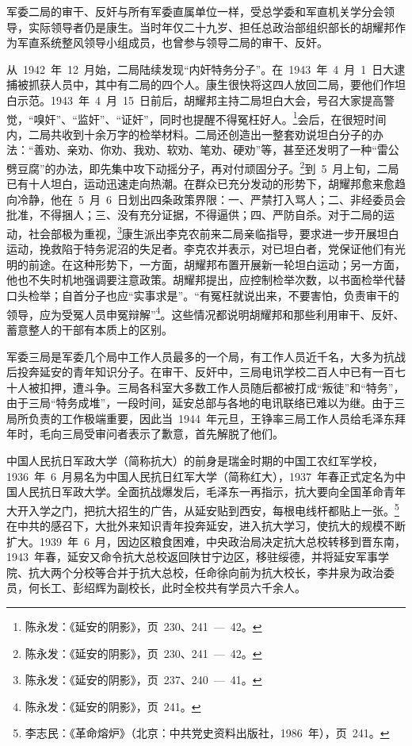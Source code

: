 军委二局的审干、反奸与所有军委直属单位一样，受总学委和军直机关学分会领导，实际领导者仍是康生。当时年仅二十九岁、担任总政治部组织部长的胡耀邦作为军直系统整风领导小组成员，也曾参与领导二局的审干、反奸。

从~1942~年~12~月始，二局陆续发现“内奸特务分子”。在~1943~年~4~月~1~日大逮捕被抓获人员中，其中有二局的四个人。康生很快将这四人放回二局，要他们作坦白示范。1943~年~4~月~15~日前后，胡耀邦主持二局坦白大会，号召大家提高警觉，“嗅奸”、“监奸”、“证奸”，同时也提醒不得冤枉好人。\footnote{陈永发：《延安的阴影》，页~230、241~—~42。}会后，在很短时间内，二局共收到十余万字的检举材料。二局还创造出一整套劝说坦白分子的办法：“善劝、亲劝、你劝、我劝、软劝、笔劝、硬劝”等，甚至还发明了一种“雷公劈豆腐”的办法，即先集中攻下动摇分子，再对付顽固分子。\footnote{陈永发：《延安的阴影》，页~230、241~—~42。}到~5~月上旬，二局已有十人坦白，运动迅速走向热潮。在群众已充分发动的形势下，胡耀邦愈来愈趋向冷静，他在~5~月~6~日划出四条政策界限：一、严禁打入骂人；二、非经委员会批准，不得捆人；三、没有充分证据，不得逼供；四、严防自杀。对于二局的运动，社会部极为重视，\footnote{陈永发：《延安的阴影》，页~237、240~—~41。}康生派出李克农前来二局亲临指导，要求进一步开展坦白运动，挽救陷于特务泥沼的失足者。李克农并表示，对已坦白者，党保证他们有光明的前途。在这种形势下，一方面，胡耀邦布置开展新一轮坦白运动；另一方面，他也不失时机地强调要注意政策。胡耀邦提出，应控制检举次数，以书面检举代替口头检举；自首分子也应“实事求是”。“有冤枉就说出来，不要害怕，负责审干的领导，应为受冤人员申冤辩解”\footnote{陈永发：《延安的阴影》，页~241。}。这些情况都说明胡耀邦和那些利用审干、反奸、蓄意整人的干部有本质上的区别。

军委三局是军委几个局中工作人员最多的一个局，有工作人员近千名，大多为抗战后投奔延安的青年知识分子。在审干、反奸中，三局电讯学校二百人中已有一百七十人被扣押，遭斗争。三局各科室大多数工作人员随后都被打成“叛徒”和“特务”，由于三局“特务成堆”，一段时间，延安总部与各地的电讯联络已难以为继。由于三局所负责的工作极端重要，因此当~1944~年元旦，王铮率三局工作人员给毛泽东拜年时，毛向三局受审问者表示了歉意，首先解脱了他们。

中国人民抗日军政大学（简称抗大）的前身是瑞金时期的中国工农红军学校，1936~年~6~月易名为中国人民抗日红军大学（简称红大），1937~年春正式定名为中国人民抗日军政大学。全面抗战爆发后，毛泽东一再指示，抗大要向全国革命青年大开入学之门，把抗大招生的广告，从延安贴到西安，每根电线杆都贴上一张。\footnote{李志民：《革命熔炉》（北京：中共党史资料出版社，1986~年），页~241。}在中共的感召下，大批外来知识青年投奔延安，进入抗大学习，使抗大的规模不断扩大。1939~年~6~月，因边区粮食困难，中央政治局决定抗大总校转移到晋东南，1943~年春，延安又命令抗大总校返回陕甘宁边区，移驻绥德，并将延安军事学院、抗大两个分校等合并于抗大总校，任命徐向前为抗大校长，李井泉为政治委员，何长工、彭绍辉为副校长，此时全校共有学员六千余人。

